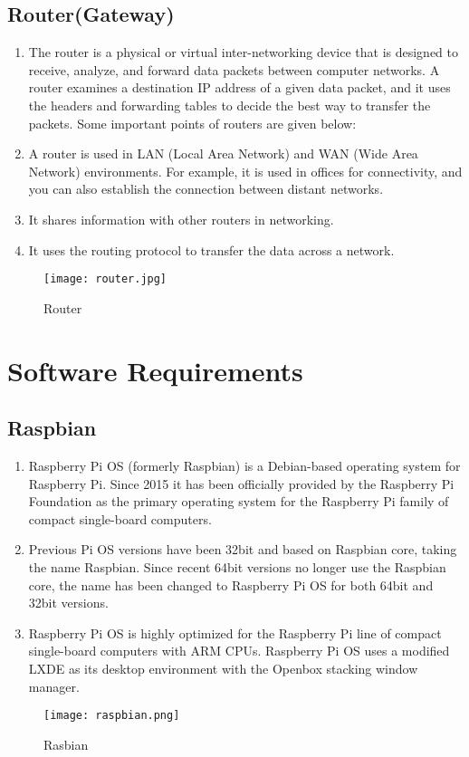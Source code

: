 \subsection{Router(Gateway)}
\begin{enumerate}
\item The router is a physical or virtual inter-networking device that is designed to receive, analyze, and forward data packets between computer networks. A router examines a destination IP address of a given data packet, and it uses the headers and forwarding tables to decide the best way to transfer the packets. 
Some important points of routers are given below: 
\item A router is used in LAN (Local Area Network) and WAN (Wide Area Network) environments. For example, it is used in offices for connectivity, and you can also establish the connection between distant networks. 
\item It shares information with other routers in networking. 
\item It uses the routing protocol to transfer the data across a network. 
\end{enumerate}
\begin{figure}[h]
\centering
\texttt{[image: router.jpg]}
\caption{Router}
\end{figure}
\section{Software Requirements}
\subsection{Raspbian}
\begin{enumerate}
\item Raspberry Pi OS (formerly Raspbian) is a Debian-based operating system for Raspberry Pi. Since 2015 it has been officially provided by the Raspberry Pi Foundation as the primary operating system for the Raspberry Pi family of compact single-board computers. 
\item Previous Pi OS versions have been 32bit and based on Raspbian core, taking the name Raspbian. Since recent 64bit versions no longer use the Raspbian core, the name has been changed to Raspberry Pi OS for both 64bit and 32bit versions.
\item Raspberry Pi OS is highly optimized for the Raspberry Pi line of compact single-board computers with ARM CPUs. Raspberry Pi OS uses a modified LXDE as its desktop environment with the Openbox stacking window \\manager. 
\end{enumerate}
\begin{figure}[h]
\centering
\texttt{[image: raspbian.png]}
\caption{Rasbian}
\end{figure}
